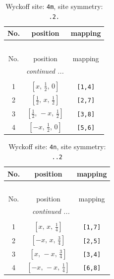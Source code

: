 \documentclass[fleqn,8pt]{jsarticle}
\begin{document}
\renewcommand{\arraystretch}{1.2}
\begin{longtable}{ccc}
\caption{Wyckoff site: {\tt 4m}, site symmetry: {\tt .2.}}
 \\
 \hline \hline
No. & position & mapping \\ \hline \endfirsthead

\multicolumn{2}{l}{\tablename\ \thetable{}} \\
 \hline \hline
No. & position & mapping \\ \hline \endhead

 \hline \hline
\multicolumn{2}{r}{\footnotesize\it continued ...} \\ \endfoot

 \hline \hline
\multicolumn{2}{r}{} \\ \endlastfoot

1 & $\left[ x,\, \frac{1}{2},\, 0 \right]$ & {\tt [1,4]} \\ \hline
2 & $\left[ \frac{1}{2},\, x,\, \frac{1}{2} \right]$ & {\tt [2,7]} \\ \hline
3 & $\left[ \frac{1}{2},\, - x,\, \frac{1}{2} \right]$ & {\tt [3,8]} \\ \hline
4 & $\left[ - x,\, \frac{1}{2},\, 0 \right]$ & {\tt [5,6]} \\
\end{longtable}
\renewcommand{\arraystretch}{1.2}
\begin{longtable}{ccc}
\caption{Wyckoff site: {\tt 4n}, site symmetry: {\tt ..2}}
 \\
 \hline \hline
No. & position & mapping \\ \hline \endfirsthead

\multicolumn{2}{l}{\tablename\ \thetable{}} \\
 \hline \hline
No. & position & mapping \\ \hline \endhead

 \hline \hline
\multicolumn{2}{r}{\footnotesize\it continued ...} \\ \endfoot

 \hline \hline
\multicolumn{2}{r}{} \\ \endlastfoot

1 & $\left[ x,\, x,\, \frac{1}{4} \right]$ & {\tt [1,7]} \\ \hline
2 & $\left[ - x,\, x,\, \frac{3}{4} \right]$ & {\tt [2,5]} \\ \hline
3 & $\left[ x,\, - x,\, \frac{3}{4} \right]$ & {\tt [3,4]} \\ \hline
4 & $\left[ - x,\, - x,\, \frac{1}{4} \right]$ & {\tt [6,8]} \\
\end{longtable}
\end{document}
